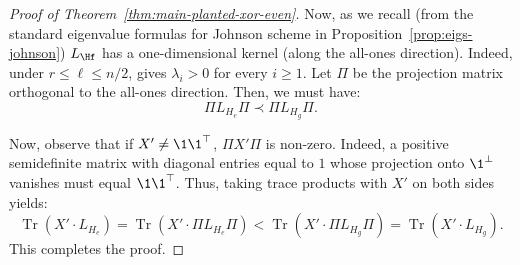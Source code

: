 \documentclass
[11pt,letterpaper]
{article}
\providecommand*{\Tr}{\mathop{\mathrm{Tr}}}
\providecommand*{\E}{\mathop{\mathbb{E}}}
\begin{document}
\begin{proof}[Proof of Theorem~\ref{thm:main-planted-xor-even}]
Now, as we recall (from the standard eigenvalue formulas for Johnson scheme in Proposition~\ref{prop:eigs-johnson}) $L_{\Hf}$ has a one-dimensional kernel (along the all-ones direction). Indeed, under $r\leq \ell \leq n/2$,  gives $\lambda_i>0$ for every $i\geq 1$. Let $\Pi$ be the projection matrix orthogonal to the all-ones direction. Then, we must have:
\[
\Pi L_{H_e} \Pi \prec \Pi L_{H_g} \Pi.
\]

Now, observe that if $X' \neq \1 \1^{\top}$, $\Pi X' \Pi$ is non-zero. Indeed, a positive semidefinite matrix with diagonal entries equal to $1$ whose projection onto $\1^{\perp}$ vanishes must equal $\1\1^{\top}$. Thus, taking trace products with $X'$ on both sides  yields: 
\[
\Tr(X' \cdot L_{H_e}) = \Tr( X' \cdot \Pi L_{H_e} \Pi ) < \Tr ( X' \cdot \Pi L_{H_g} \Pi) = \Tr(X' \cdot L_{H_g}).
\]
This completes the proof. 
\end{proof}











\end{document}

